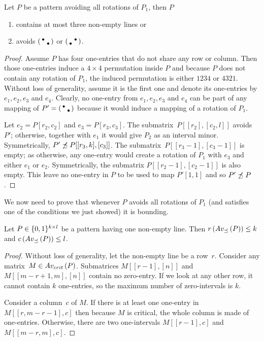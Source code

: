 \begin{thm}
\label{thm:boundedints}
Let $P$ be a pattern avoiding all rotations of $P_1$, then $P$
\begin{enumerate}
	\item contains at most three non-empty lines or
	\item avoids $\left(\begin{smallmatrix}\bullet& \\ &\bullet\end{smallmatrix}\right)$ or $\left(\begin{smallmatrix} &\bullet\\\bullet& \end{smallmatrix}\right)$.
\end{enumerate}
\end{thm}
\begin{proof}
Assume $P$ has four one-entries that do not share any row or column. Then those one-entries induce a $4\times4$ permutation inside $P$ and because $P$ does not contain any rotation of $P_1$, the induced permutation is either $1234$ or $4321$. Without loss of generality, assume it is the first one and denote its one-entries by $e_1,e_2,e_3$ and $e_4$. Clearly, no one-entry from $e_1,e_2,e_3$ and $e_4$ can be part of any mapping of $P'=\left(\begin{smallmatrix}\bullet& \\ &\bullet\end{smallmatrix}\right)$ because it would induce a mapping of a rotation of $P_1$.

Let $e_2=P[r_2,c_2]$ and $e_3=P[r_3,c_3]$. The submatrix~$P[[r_2],[c_2,l]]$ avoids $P'$; otherwise, together with $e_1$ it would give $P_2$ as an interval minor. Symmetrically, $P'\not\preceq P[[r_3,k],[c_3]]$. The submatrix~$P[[r_3-1],[c_3-1]]$ is empty; as otherwise, any one-entry would create a rotation of $P_1$ with $e_3$ and either $e_1$ or $e_2$. Symmetrically, the submatrix $P[[r_2-1],[c_2-1]]$ is also empty. This leave no one-entry in $P$ to be used to map $P'[1,1]$ and so $P'\not\preceq P$.
\end{proof}

We now need to prove that whenever $P$ avoids all rotations of $P_1$ (and satisfies one of the conditions we just showed) it is bounding.

\begin{lemma}
Let $P\in\{0,1\}^{k\times l}$ be a pattern having one non-empty line. Then $r\left(Av_{\preceq}\left(P\right)\right)\leq k$ and $c\left(Av_{\preceq}\left(P\right)\right)\leq l$.
\end{lemma}
\begin{proof}
Without loss of generality, let the non-empty line be a row~$r$. Consider any matrix~$M\in Av_{crit}\left(P\right)$. Submatrices $M[[r-1],[n]]$ and $M[[m-r+1,m],[n]]$ contain no zero-entry. If we look at any other row, it cannot contain $k$ one-entries, so the maximum number of zero-intervals is $k$.

Consider a column~$c$ of $M$. If there is at least one one-entry in $M[[r,m-r-1],c]$ then because $M$ is critical, the whole column is made of one-entries. Otherwise, there are two one-intervals $M[[r-1],c]$ and $M[[m-r,m],c]$.
\end{proof}

